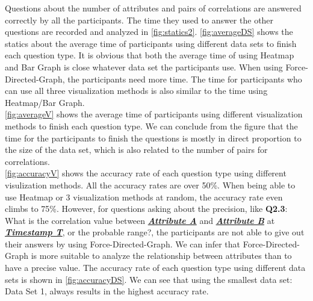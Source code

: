 Questions about the number of attributes and pairs of correlations are answered correctly by all the participants. The time they used to answer the other questions are recorded and analyzed in \autoref{fig:statics2}. \autoref{fig:averageDS} shows the statics about the average time of participants using different data sets to finish each question type. It is obvious that both the average time of using Heatmap and Bar Graph is close whatever data set the participants use. When using Force-Directed-Graph, the participants need more time. The time for participants who can use all three visualization methods is also similar to the time using Heatmap/Bar Graph.\\
\autoref{fig:averageV} shows the average time of participants using different visualization methods to finish each question type. We can conclude from the figure that the time for the participants to finish the questions is mostly in direct proportion to the size of the data set, which is also related to the number of pairs for correlations.\\
\autoref{fig:accuracyV} shows the accuracy rate of each question type using different visulization methods. All the accuracy rates are over 50\%. When being able to use Heatmap or 3 visualization methods at random, the accuracy rate even climbs to 75\%. However, for questions asking about the precision, like \textbf{Q2.3}: What is the correlation value between \textit{\textbf{\underline{Attribute A}}} and \textit{\textbf{\underline{Attribute B}}} at \textit{\textbf{\underline{Timestamp T}}}, or the probable range?, the participants are not able to give out their answers by using Force-Directed-Graph. We can infer that Force-Directed-Graph is more suitable to analyze the relationship between attributes than to have a precise value. The accuracy rate of each question type using different data sets is shown in \autoref{fig:accuracyDS}. We can see that using the smallest data set: Data Set 1, always results in the highest accuracy rate.

